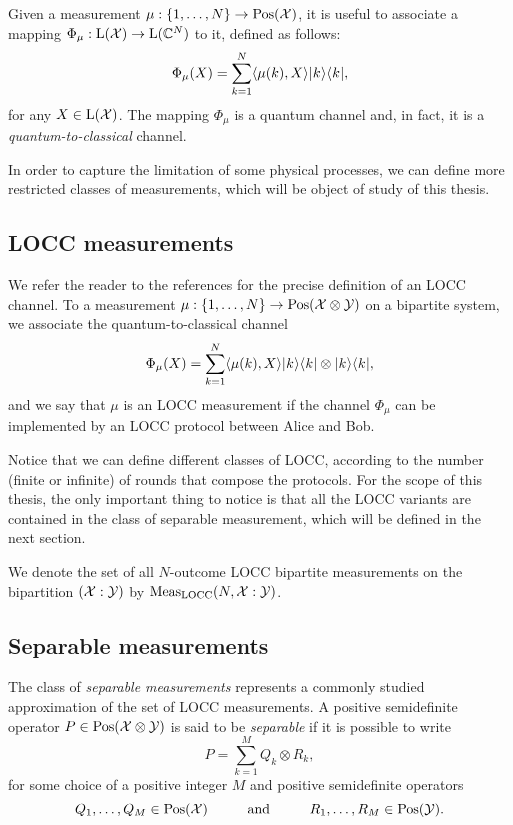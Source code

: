 Given a measurement $\mu: \{1, \ldots, N \} \rightarrow \mathrm{Pos}(\mathcal{X})$,
it is useful to associate a mapping $\Phi_{\mu}:\mathrm{L}(\mathcal{X})\rightarrow\mathrm{L}(\mathbb{C}^{N})$ to it,
defined as follows:
\begin{equation}
\label{eq:measurement-channel}
  \Phi_{\mu}(X) = \sum_{k=1}^{N}\langle \mu(k) , X\rangle\lvert\mspace{0.5mu} k \mspace{0.5mu} \rangle\langle\mspace{0.5mu} k \mspace{0.5mu} \rvert,
\end{equation}
for any $X\in\mathrm{L}(\mathcal{X})$. The mapping $\Phi_{\mu}$ is a quantum channel and, in fact,
it is a \emph{quantum-to-classical} channel.

In order to capture the limitation of some physical processes, we can define more restricted 
classes of measurements, which will be object of study of this thesis.

\subsection{LOCC measurements}

We refer the reader to the references \cite{Mancinska13,Watrous15} for the precise
definition of an LOCC channel.
To a measurement $\mu: \{1, \ldots, N \} \rightarrow \mathrm{Pos}(\mathcal{X}\otimes\mathcal{Y})$ on a bipartite
system, we associate the quantum-to-classical channel
\begin{equation}
\label{eq:measurement-channel-bipartite}
  \Phi_{\mu}(X) = \sum_{k=1}^{N}\langle \mu(k) , X\rangle\lvert\mspace{0.5mu} k \mspace{0.5mu} \rangle\langle\mspace{0.5mu} k \mspace{0.5mu} \rvert\otimes\lvert\mspace{0.5mu} k \mspace{0.5mu} \rangle\langle\mspace{0.5mu} k \mspace{0.5mu} \rvert,
\end{equation}
and we say that $\mu$ is an LOCC measurement if the channel $\Phi_{\mu}$ can be 
implemented by an LOCC protocol between Alice and Bob.

Notice that we can define different classes of LOCC, 
according to the number (finite or infinite) of rounds that compose the protocols.
For the scope of this thesis, the only important thing to notice is that all the LOCC variants
are contained in the class of separable measurement, which will be defined in the next
section.

We denote the set of all $N$-outcome LOCC bipartite measurements 
on the bipartition $(\mathcal{X}:\mathcal{Y})$ by $\mathrm{Meas}_{\mathrm{LOCC}}(N, \mathcal{X}:\mathcal{Y})$.

\subsection{Separable measurements}

The class of \emph{separable measurements} represents a commonly studied
approximation of the set of LOCC measurements.
A positive semidefinite operator $P\in\mathrm{Pos}(\mathcal{X}\otimes\mathcal{Y})$ is said to be
\emph{separable} if it is possible to write
\begin{equation}
  P = \sum_{k = 1}^{M} Q_k \otimes R_k,
\end{equation}
for some choice of a positive integer $M$ and positive semidefinite operators
\begin{equation}
  Q_1,\ldots,Q_M \in \mathrm{Pos}(\mathcal{X})
  \hspace*{1cm}\mbox{and}\hspace*{1cm}
  R_1,\ldots,R_M\in\mathrm{Pos}(\mathcal{Y}).
\end{equation}

